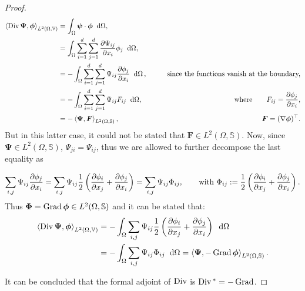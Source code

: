 \begin{theorem}
\begin{proof}
		\[
		\begin{aligned}
		\left\langle \Div\bm{\Psi} , \bm{\phi} \right\rangle_{L^2(\Omega, \mathbb{V})} &= \int_{\Omega}  \bm{\psi} \cdot \bm{\phi} \; \d\Omega, \\
		&= \int_{\Omega} \sum_{i=1}^d \sum_{j=1}^d \diffp{\Psi_{ij}}{x_i} \phi_j \; \d\Omega,  \\ 
		&= - \int_{\Omega} \sum_{i=1}^d \sum_{j=1}^d \Psi_{ij} \diffp{\phi_j}{x_i} \; \d\Omega\,, \qquad &\text{since the functions vanish at the boundary,}\\
		&= - \int_{\Omega} \sum_{i=1}^d \sum_{j=1}^d \Psi_{ij} {F}_{ij} \;\d\Omega,  \qquad &\where {F}_{ij} = \diffp{\phi_j}{x_i},\\
		&= - \left\langle \bm{\Psi} , \bm{F} \right\rangle_{L^2(\Omega, \mathbb{S})},  \qquad &\bm{F} = (\nabla{\bm\phi})^\top.
		\end{aligned}	 
		\]
		But in this latter case, it could not  be stated that $\bm{F} \in L^2(\Omega, \mathbb{S})$. Now, since  $\bm{\Psi} \in L^2(\Omega, \mathbb{S})$, $\Psi_{ji}=\Psi_{ij}$,  thus we are  allowed to further decompose the last equality as
		
		\[ \sum_{i,j}\Psi_{ij} \diffp{\phi_j}{x_i} = \sum_{i,j}\Psi_{ij} \frac{1}{2} \left(\diffp{\phi_i}{x_j} + \diffp{\phi_j}{x_i}  \right) = 	\sum_{i,j} \Psi_{ij} {\Phi}_{ij}, \qquad \text{with } {\Phi}_{ij}:= \frac{1}{2} \left(\diffp{\phi_i}{x_j} + \diffp{\phi_j}{x_i}  \right).
		\]
		Thus $\bm{\Phi}=\operatorname*{Grad} \bm{\phi} \in L^2(\Omega, \mathbb{S})$ and it can be stated that:
		\begin{align*}
		\left\langle \Div\bm{\Psi} , \bm{\phi} \right\rangle_{L^2(\Omega, \mathbb{V})} &= - \int_{\Omega} \sum_{i,j} \Psi_{ij} \frac{1}{2} \left(\diffp{\phi_i}{x_j} + \diffp{\phi_j}{x_i}  \right) \;\d\Omega \\
		&= - \int_{\Omega} \sum_{i,j} \Psi_{ij} \Phi_{ij} \;\d\Omega = \left\langle \bm{\Psi} , -\Grad \bm{\phi} \right\rangle_{L^2(\Omega, \mathbb{S})}.
		\end{align*}

		It can be concluded that the formal adjoint of $\operatorname*{Div}$ is $\operatorname*{Div}{}^* = -\operatorname*{Grad}$.
	\end{proof}
\end{theorem}

